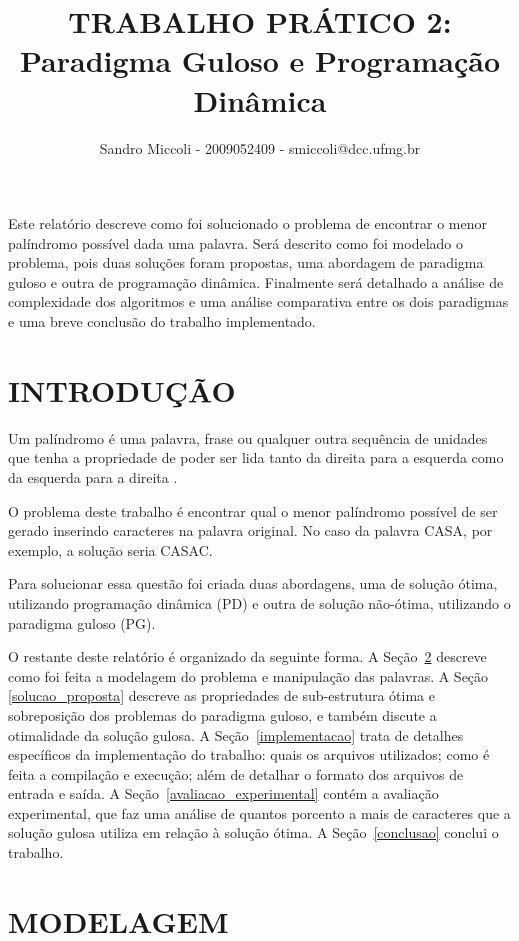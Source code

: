 \documentclass[12pt]{article}
\title{TRABALHO PRÁTICO 2: \\ Paradigma Guloso e Programação Dinâmica}
\author{Sandro Miccoli - 2009052409 - smiccoli@dcc.ufmg.br}
\begin{document}
\maketitle

\begin{resumo}
Este relatório descreve como foi solucionado o problema de encontrar o menor palíndromo possível dada uma palavra. Será descrito como foi modelado o problema, pois duas soluções foram propostas, uma abordagem de paradigma guloso e outra de programação dinâmica. Finalmente será detalhado a análise de complexidade dos algoritmos e uma análise comparativa entre os dois paradigmas e uma breve conclusão do trabalho implementado.
\end{resumo}

\section{INTRODUÇÃO}

    Um palíndromo é uma palavra, frase ou qualquer outra sequência de unidades que tenha a propriedade de poder ser lida tanto da direita para a esquerda como da esquerda para a direita \cite{wikipalin}.

    O problema deste trabalho é encontrar qual o menor palíndromo possível de ser gerado inserindo caracteres na palavra original. No caso da palavra CASA, por exemplo, a solução seria CASAC.

    Para solucionar essa questão foi criada duas abordagens, uma de solução ótima, utilizando programação dinâmica (PD) e outra de solução não-ótima, utilizando o paradigma guloso (PG).

	O restante deste relatório é organizado da seguinte forma. A Seção~\ref{modelagem} descreve como foi feita a modelagem do problema e manipulação das palavras. A Seção \ref{solucao_proposta} descreve as propriedades de sub-estrutura ótima e sobreposição dos problemas do paradigma guloso, e também discute a otimalidade da solução gulosa. A Seção~\ref{implementacao} trata de detalhes específicos da implementação do trabalho: quais os arquivos utilizados; como é feita a compilação e execução; além de detalhar o formato dos arquivos de entrada e saída. A Seção~\ref{avaliacao_experimental} contém a avaliação experimental, que faz uma análise de quantos porcento a mais de caracteres que a solução gulosa utiliza em relação à solução ótima. A Seção~\ref{conclusao} conclui o trabalho.


\section{MODELAGEM}
\label{modelagem}
\end{document}
